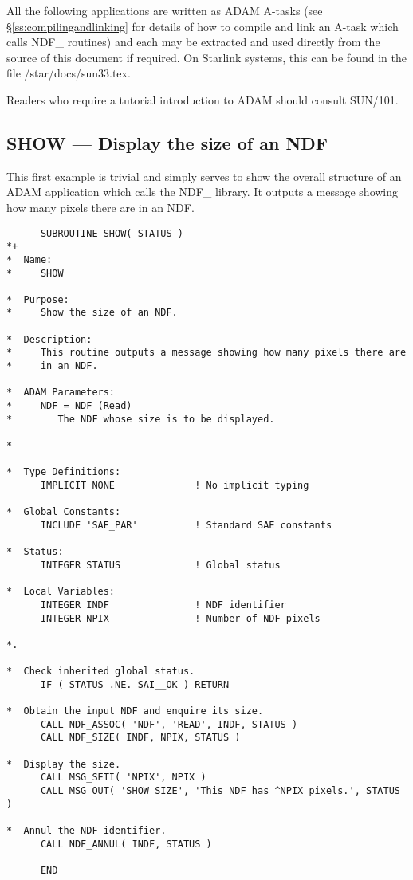 \documentclass[twoside,11pt]{article}
\newcommand{\xref}[3]{#1}
\newcommand{\xlabel}[1]{}
\begin{document}
All the following applications are written as \xref{ADAM}{sg4}{}
A-tasks (see \S\ref{ss:compilingandlinking} for details of how to
compile and link an A-task which calls NDF\_ routines) and each may be
extracted and used directly from the source of this document if
required. On Starlink systems, this can be found in the file
/star/docs/sun33.tex.

Readers who require a tutorial introduction to ADAM should consult
\xref{SUN/101}{sun101}{}.

\subsection{\xlabel{SHOW}SHOW --- Display the size of an NDF}

This first example is trivial and simply serves to show the overall
structure of an \xref{ADAM}{sg4}{} application which calls the NDF\_
library. It
outputs a message showing how many pixels there are in an NDF.

\small
\begin{verbatim}
      SUBROUTINE SHOW( STATUS )
*+
*  Name:
*     SHOW

*  Purpose:
*     Show the size of an NDF.

*  Description:
*     This routine outputs a message showing how many pixels there are
*     in an NDF.

*  ADAM Parameters:
*     NDF = NDF (Read)
*        The NDF whose size is to be displayed.

*-
      
*  Type Definitions:
      IMPLICIT NONE              ! No implicit typing

*  Global Constants:
      INCLUDE 'SAE_PAR'          ! Standard SAE constants

*  Status:
      INTEGER STATUS             ! Global status

*  Local Variables:
      INTEGER INDF               ! NDF identifier
      INTEGER NPIX               ! Number of NDF pixels

*.

*  Check inherited global status.
      IF ( STATUS .NE. SAI__OK ) RETURN

*  Obtain the input NDF and enquire its size.
      CALL NDF_ASSOC( 'NDF', 'READ', INDF, STATUS )
      CALL NDF_SIZE( INDF, NPIX, STATUS )

*  Display the size.
      CALL MSG_SETI( 'NPIX', NPIX )
      CALL MSG_OUT( 'SHOW_SIZE', 'This NDF has ^NPIX pixels.', STATUS )

*  Annul the NDF identifier.
      CALL NDF_ANNUL( INDF, STATUS )

      END
\end{verbatim}
\normalsize
\end{document}
